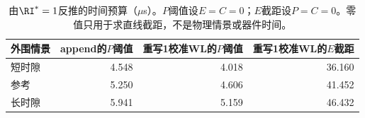 \begin{table}[htbp]\centering\small
\begin{tabular}{@{}lrrr@{}}\toprule
外围情景 & append的$P$阈值 & 重写1校准WL的$P$阈值 & 重写1校准WL的$E$截距\\\midrule
短时隙 & 4.548 & 4.018 & 36.160\\
参考 & 5.250 & 4.606 & 41.452\\
长时隙 & 5.941 & 5.159 & 46.432\\
\bottomrule\end{tabular}
\caption{由$\RI^*=1$反推的时间预算（$\mu$s）。$P$阈值设$E=C=0$；$E$截距设$P=C=0$。零值只用于求直线截距，不是物理情景或器件时间。}
\label{tab:threshold}\end{table}
